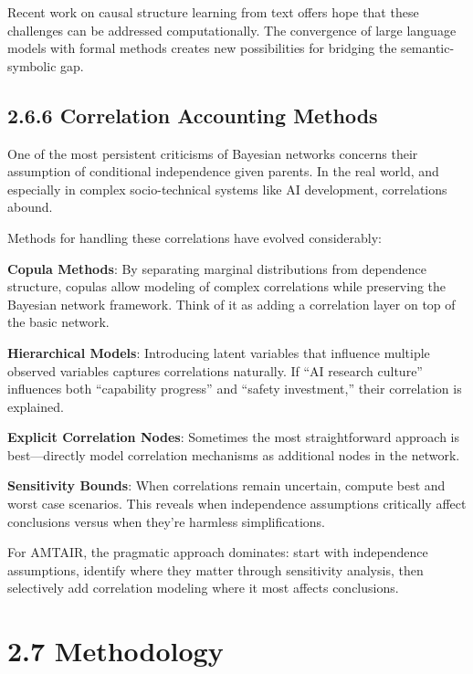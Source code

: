 \documentclass[
  11pt,
  letterpaper,
  openany]{book}
\begin{document}
Recent work on causal structure learning from text
\textcite{babakov2025} \textcite{ban2023} \textcite{bethard2007} offers
hope that these challenges can be addressed computationally. The
convergence of large language models with formal methods creates new
possibilities for bridging the semantic-symbolic gap.

\subsection{2.6.6 Correlation Accounting
Methods}\label{sec-correlation-methods}

One of the most persistent criticisms of Bayesian networks concerns
their assumption of conditional independence given parents. In the real
world, and especially in complex socio-technical systems like AI
development, correlations abound.

Methods for handling these correlations have evolved considerably:

\textbf{Copula Methods}: By separating marginal distributions from
dependence structure, copulas \textcite{nelson2006} allow modeling of
complex correlations while preserving the Bayesian network framework.
Think of it as adding a correlation layer on top of the basic network.

\textbf{Hierarchical Models}: Introducing latent variables that
influence multiple observed variables captures correlations naturally.
If ``AI research culture'' influences both ``capability progress'' and
``safety investment,'' their correlation is explained.

\textbf{Explicit Correlation Nodes}: Sometimes the most straightforward
approach is best---directly model correlation mechanisms as additional
nodes in the network.

\textbf{Sensitivity Bounds}: When correlations remain uncertain, compute
best and worst case scenarios. This reveals when independence
assumptions critically affect conclusions versus when they're harmless
simplifications.

For AMTAIR, the pragmatic approach dominates: start with independence
assumptions, identify where they matter through sensitivity analysis,
then selectively add correlation modeling where it most affects
conclusions.

\section{2.7 Methodology}\label{sec-methodology}
\end{document}
